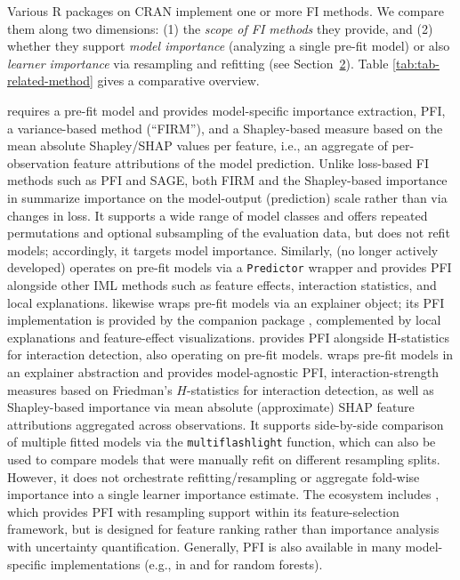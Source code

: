Various R packages on CRAN implement one or more FI methods.
We compare them along two dimensions:
(1) the \emph{scope of FI methods} they provide, and
(2) whether they support \emph{model importance} (analyzing a single pre-fit model) or also \emph{learner importance} via resampling and refitting (see Section~\hyperref[sec-fi-methods]{2}).
Table \ref{tab:tab-related-method} gives a comparative overview.

 \citep{greenwell2020variable} requires a pre-fit model and provides model-specific importance extraction, PFI, a variance-based method (``FIRM''), and a Shapley-based measure based on the mean absolute Shapley/SHAP values per feature, i.e., an aggregate of per-observation feature attributions of the model prediction.
Unlike loss-based FI methods such as PFI and SAGE, both FIRM and the Shapley-based importance in  summarize importance on the model-output (prediction) scale rather than via changes in loss.
It supports a wide range of model classes and offers repeated permutations and optional subsampling of the evaluation data, but does not refit models;
accordingly, it targets model importance.
Similarly,  (no longer actively developed) operates on pre-fit models via a \texttt{Predictor} wrapper and provides PFI alongside other IML methods such as feature effects, interaction statistics, and local explanations.
 likewise wraps pre-fit models via an explainer object;
its PFI implementation is provided by the companion package , complemented by local explanations and feature-effect visualizations.
 provides PFI alongside H-statistics for interaction detection, also operating on pre-fit models.
 wraps pre-fit models in an explainer abstraction and provides model-agnostic PFI, interaction-strength measures based on Friedman's \(H\)-statistics for interaction detection, as well as Shapley-based importance via mean absolute (approximate) SHAP feature attributions aggregated across observations.
It supports side-by-side comparison of multiple fitted models via the \texttt{multiflashlight} function, which can also be used to compare models that were manually refit on different resampling splits.
However, it does not orchestrate refitting/resampling or aggregate fold-wise importance into a single learner importance estimate.
The  ecosystem includes , which provides PFI with resampling support within its feature-selection framework, but is designed for feature ranking rather than importance analysis with uncertainty quantification.
Generally, PFI is also available in many model-specific implementations (e.g., in  and  for random forests).

